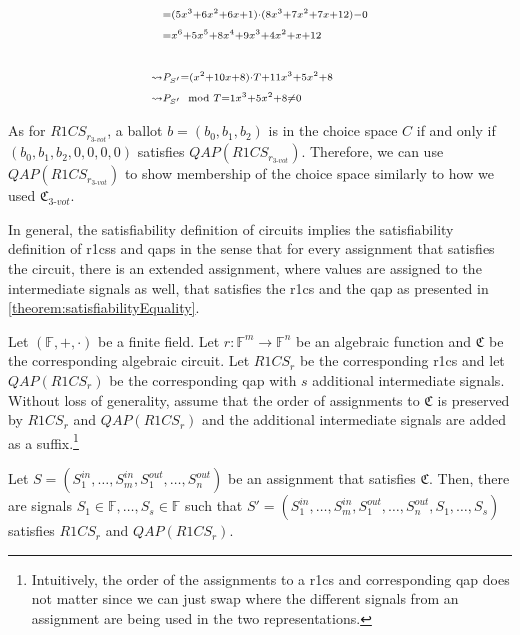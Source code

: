 \begin{itemize}
{\begin{align*}
        \scriptstyle &\scriptstyle= (5x^3+6x^2+6x+1)\cdot(8x^3+7x^2+7x+12)-0\\
        \scriptstyle &\scriptstyle= x^{6} + 5 x^{5} + 8 x^{4} + 9 x^{3} + 4 x^{2} + x + 12\\
        &\\
        \scriptstyle \rightsquigarrow&\scriptstyle P_{S'} = (x^{2} + 10 x + 8)\cdot T + 11 x^{3} + 5 x^{2} + 8\\
        \scriptstyle \rightsquigarrow&\scriptstyle P_{S'}\mod T = 1 x^{3} + 5 x^{2} + 8\neq 0
    \end{align*}
    }
\end{itemize}

As for $R1CS_{r_{3\text{-}vot}}$, a ballot $b=(b_0,b_1,b_2)$ is in the choice space $C$ if and only if $(b_0,b_1,b_2,0,0,0,0)$ satisfies $QAP(R1CS_{r_{3\text{-}vot}})$.
Therefore, we can use $QAP(R1CS_{r_{3\text{-}vot}})$ to show membership of the choice space similarly to how we used $\mathfrak{C}_{3\text{-}vot}$.

In general, the satisfiability definition of circuits implies the satisfiability definition of \glspl{r1cs} and \glspl{qap} in the sense that for every assignment that satisfies the circuit, there is an extended assignment, where values are assigned to the intermediate signals as well, that satisfies the \gls{r1cs} and the \gls{qap} as presented in \cref{theorem:satisfiabilityEquality}.
\newpage
\begin{theorem}
    \label{theorem:satisfiabilityEquality}
    Let $(\mathbb{F}, +, \cdot )$ be a finite field.
    Let $r:\mathbb{F}^m\to \mathbb{F}^n$ be an algebraic function and $\mathfrak{C}$ be the corresponding algebraic circuit.
    Let $R1CS_r$ be the corresponding \gls{r1cs} and let $QAP(R1CS_r)$ be the corresponding \gls{qap} with $s$ additional intermediate signals.
    Without loss of generality, assume that the order of assignments to $\mathfrak{C}$ is preserved by $R1CS_r$ and $QAP(R1CS_r)$ and the additional intermediate signals are added as a suffix.\footnote{
        \label{footnote:assignmentOrderDoesNotMatter}
        Intuitively, the order of the assignments to a \gls{r1cs} and corresponding \gls{qap} does not matter since we can just swap where the different signals from an assignment are being used in the two representations.
    }

    Let $S=(S_1^{in},\dots, S_m^{in}, S_1^{out}, \dots, S_n^{out})$ be an assignment that satisfies $\mathfrak{C}$.
    Then, there are signals $S_1\in\mathbb{F},\dots, S_s\in\mathbb{F}$ such that $S'=(S_1^{in},\dots, S_m^{in}, S_1^{out}, \dots, S_n^{out}, S_1,\dots, S_s)$ satisfies $R1CS_r$ and $QAP(R1CS_r)$.
\end{theorem}

